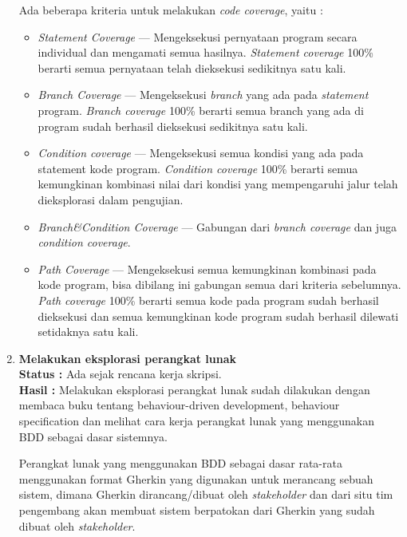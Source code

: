 \documentclass[a4paper,twoside]{article}
\begin{document}
\begin{enumerate}
Ada beberapa kriteria untuk melakukan \textit{code coverage}, yaitu :
\begin{itemize}
\item \textit{Statement Coverage} --- Mengeksekusi pernyataan program secara individual dan mengamati semua hasilnya. \textit{Statement coverage} 100\% berarti semua pernyataan telah dieksekusi sedikitnya satu kali.
\item \textit{Branch Coverage} --- Mengeksekusi \textit{branch} yang ada pada \textit{statement} program. \textit{Branch coverage} 100\% berarti semua branch yang ada di program sudah berhasil dieksekusi sedikitnya satu kali.
\item \textit{Condition coverage} --- Mengeksekusi semua kondisi yang ada pada statement kode program.
\textit{Condition coverage} 100\% berarti semua kemungkinan kombinasi nilai dari kondisi yang mempengaruhi jalur telah dieksplorasi dalam  pengujian.
\item \textit{Branch\&Condition Coverage} --- Gabungan dari \textit{branch coverage} dan juga \textit{condition coverage}.
\item \textit{Path Coverage} --- Mengeksekusi semua kemungkinan kombinasi pada kode program, bisa dibilang ini gabungan semua dari kriteria sebelumnya. \textit{Path coverage} 100\% berarti semua kode pada program sudah berhasil dieksekusi dan semua kemungkinan kode program sudah berhasil dilewati setidaknya satu kali.
\end{itemize}
		
		\item \textbf{Melakukan eksplorasi perangkat lunak}\\
		{\bf Status :} Ada sejak rencana kerja skripsi.\\
		{\bf Hasil :} Melakukan eksplorasi perangkat lunak sudah dilakukan dengan membaca buku tentang behaviour-driven development, behaviour specification dan melihat cara kerja perangkat lunak yang menggunakan BDD sebagai dasar sistemnya.
		
Perangkat lunak yang menggunakan BDD sebagai dasar rata-rata menggunakan format Gherkin yang digunakan untuk merancang sebuah sistem, dimana Gherkin dirancang/dibuat oleh \textit{stakeholder} dan dari situ tim pengembang akan membuat sistem berpatokan dari Gherkin yang sudah dibuat oleh \textit{stakeholder}.


\end{enumerate}
\end{document}
